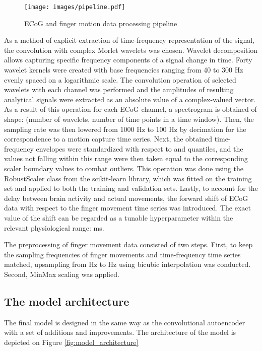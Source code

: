 \documentclass[letterpaper]{article} \usepackage{aaai22}  \usepackage{times}  \usepackage{helvet}  \usepackage{courier}  \usepackage[hyphens]{url}  \usepackage{graphicx} \urlstyle{rm} \def\UrlFont{\rm}  \usepackage{natbib}  \usepackage{caption} \DeclareCaptionStyle{ruled}{labelfont=normalfont,labelsep=colon,strut=off} \frenchspacing  \setlength{\pdfpagewidth}{8.5in}  \setlength{\pdfpageheight}{11in}  \usepackage{algorithm}
\begin{document}
\begin{figure}[ht]
    \centering
    \texttt{[image: images/pipeline.pdf]}
    \caption{ECoG and finger motion data processing pipeline}
    \label{fig:processing_pipeline}
\end{figure}


As a method of explicit extraction of time-frequency representation of the signal, the convolution with complex Morlet wavelets was chosen. Wavelet decomposition allows capturing specific frequency components of a signal change in time. Forty wavelet kernels were created with base frequencies ranging from 40 to 300 Hz evenly spaced on a logarithmic scale. The convolution operation of selected wavelets with each channel was performed and the amplitudes of resulting analytical signals were extracted as an absolute value of a complex-valued vector. As a result of this operation for each ECoG channel, a spectrogram is obtained of shape: (number of wavelets, number of time points in a time window). Then, the sampling rate was then lowered from 1000 Hz to 100 Hz by decimation for the correspondence to a motion capture time series. Next, the obtained time-frequency envelopes were standardized with respect to  and  quantiles, and the values not falling within this range were then taken equal to the corresponding scaler boundary values to combat outliers. This operation was done using the RobustScaler class from the scikit-learn library, which was fitted on the training set and applied to both the training and validation sets. Lastly, to account for the delay between brain activity and actual movements, the forward shift of ECoG data with respect to the finger movement time series was introduced. The exact value of the shift can be regarded as a tunable hyperparameter within the relevant physiological range: ms.

The preprocessing of finger movement data consisted of two steps. First, to keep the sampling frequencies of finger movements and time-frequency time series matched,  upsampling from  Hz to Hz using bicubic interpolation was conducted. Second, MinMax scaling was applied.

\subsection{The model architecture}

The final model is designed in the same way as the convolutional autoencoder with a set of additions and improvements. The architecture of the model is depicted on Figure \ref{fig:model_architecture}
\end{document}
